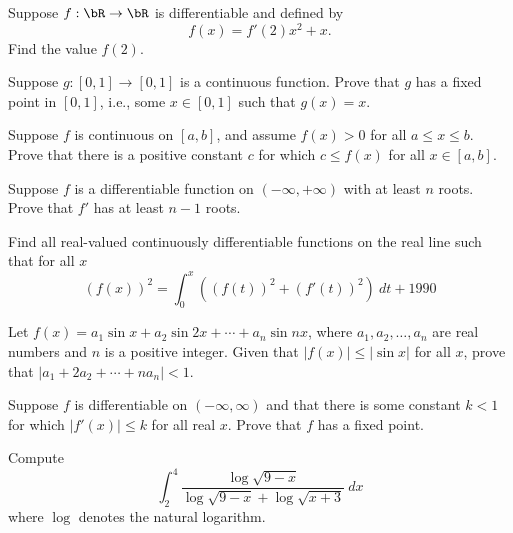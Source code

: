 \documentclass[12pt]{article}
\begin{document}
        \begin{exercise}
            Suppose \(f:\bR\to\bR\) is differentiable and defined by
            \[f(x) = f'(2)x^2 + x.\]
            Find the value \(f(2)\).
        \end{exercise}

        \begin{exercise}
            Suppose $g:[0,1]\to [0,1]$ is a continuous function. Prove that $g$ has a fixed point in $[0,1]$, i.e., some $x\in [0,1]$ such that $g(x)=x$.
        \end{exercise}
            
        \begin{exercise}
            Suppose $f$ is continuous on $[a,b]$, and assume $f(x)>0$ for all $a\leq x \leq b$. Prove that there is a positive constant $c$ for which $c\leq f(x)$ for all $x\in [a,b]$.
        \end{exercise}
            
        \begin{exercise}
            Suppose $f$ is a differentiable function on $(-\infty, +\infty)$ with at least $n$ roots. Prove that $f'$ has at least $n-1$ roots.
        \end{exercise}
            
        \begin{exercise}
            Find all real-valued continuously differentiable functions on the real line such that for all $x$
            \[(f(x))^2 = \int_0^x \left((f(t))^2 + (f'(t))^2\right)\ dt + 1990\]
        \end{exercise}
            
        \begin{exercise} Let $f(x)=a_1\sin{x}+a_2\sin{2x}+\cdots + a_n\sin{nx}$, where $a_1,a_2,\dots,a_n$ are real numbers and $n$ is a positive integer. Given that $|f(x)|\leq |\sin{x}|$ for all $x$, prove that $|a_1+2a_2+\cdots+na_n|<1$.
        \end{exercise}
            
        \begin{exercise}
            Suppose $f$ is differentiable on $(-\infty, \infty)$ and that there is some constant $k<1$ for which $|f'(x)|\leq k$ for all real $x$. Prove that $f$ has a fixed point. 
        \end{exercise}
            
        \begin{exercise}
            Compute
            \[\int_2^4 \frac{\log\sqrt{9-x}}{\log\sqrt{9-x}+\log\sqrt{x+3}}\ dx\] where $\log$ denotes the natural logarithm.
        \end{exercise}
\end{document}
